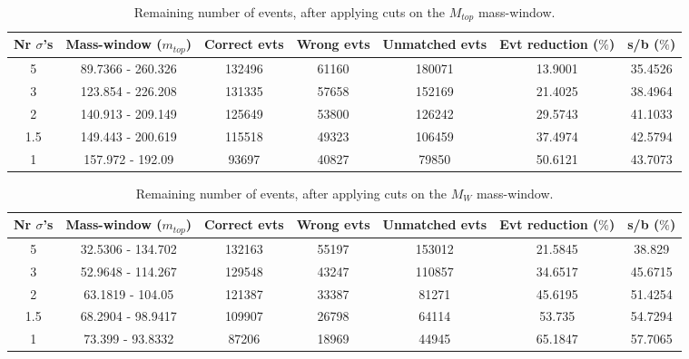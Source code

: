 \documentclass{article}
\begin{document}
 \begin{table}[h!t] 
  \caption{Remaining number of events, after applying cuts on the $M_{top}$ mass-window.} 
  \centering 
   \begin{tabular}{c|c|c|c|c|c|c}
     Nr $\sigma$'s & Mass-window ($m_{top}$)    & Correct evts    & Wrong evts     & Unmatched evts   & Evt reduction ($\%$)    & s/b ($\%$)     \\
     \hline
     5 & 89.7366 - 260.326  &   132496  &  61160  &  180071  &  13.9001 &  35.4526 \\ 
     3 & 123.854 - 226.208  &   131335  &  57658  &  152169  &  21.4025 &  38.4964 \\ 
     2 & 140.913 - 209.149  &   125649  &  53800  &  126242  &  29.5743 &  41.1033 \\ 
     1.5 & 149.443 - 200.619  &   115518  &  49323  &  106459  &  37.4974 &  42.5794 \\ 
     1 & 157.972 - 192.09  &   93697  &  40827  &  79850  &  50.6121 &  43.7073   \end{tabular} 
 \end{table} 
 
 \begin{table}[h!t] 
  \caption{Remaining number of events, after applying cuts on the $M_{W}$ mass-window.} 
  \centering 
   \begin{tabular}{c|c|c|c|c|c|c}
     Nr $\sigma$'s & Mass-window ($m_{top}$)    & Correct evts    & Wrong evts     & Unmatched evts   & Evt reduction ($\%$)    & s/b ($\%$)     \\
     \hline
     5 & 32.5306 - 134.702  &   132163  &  55197  &  153012  &  21.5845 &  38.829 \\ 
     3 & 52.9648 - 114.267  &   129548  &  43247  &  110857  &  34.6517 &  45.6715 \\ 
     2 & 63.1819 - 104.05  &   121387  &  33387  &  81271  &  45.6195 &  51.4254 \\ 
     1.5 & 68.2904 - 98.9417  &   109907  &  26798  &  64114  &  53.735 &  54.7294 \\ 
     1 & 73.399 - 93.8332  &   87206  &  18969  &  44945  &  65.1847 &  57.7065   \end{tabular} 
 \end{table} 
 
\end{document}
